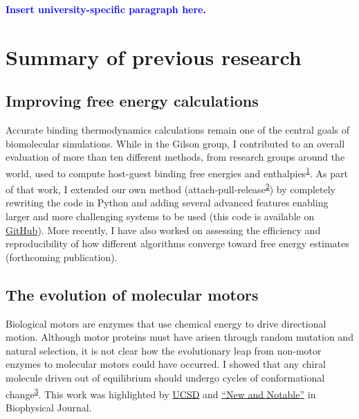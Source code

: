 \documentclass[11pt,notitlepage]{article}
\begin{document}
\textcolor{blue}{\textbf{Insert university-specific paragraph here.}}

\hypertarget{summary-of-previous-research}{%
\section{Summary of previous
research}\label{summary-of-previous-research}}

\hypertarget{improving-free-energy-calculations}{%
\subsection{Improving free energy
calculations}\label{improving-free-energy-calculations}}

Accurate binding thermodynamics calculations remain one of the central
goals of biomolecular simulations. While in the Gilson group, I
contributed to an overall evaluation of more than ten different methods,
from research groups around the world, used to compute host-guest
binding free energies and
enthalpies\textsuperscript{\protect\hyperlink{ref-BGsUYQln}{1}}. As part
of that work, I extended our own method
(attach-pull-release\textsuperscript{\protect\hyperlink{ref-uzHaEv9Z}{2}})
by completely rewriting the code in Python and adding several advanced
features enabling larger and more challenging systems to be used (this
code is available on
\href{https://www.github.com/slochower/pAPRika}{GitHub}). More recently,
I have also worked on assessing the efficiency and reproducibility of
how different algorithms converge toward free energy estimates
(forthcoming publication).

\hypertarget{the-evolution-of-molecular-motors}{%
\subsection{The evolution of molecular
motors}\label{the-evolution-of-molecular-motors}}

Biological motors are enzymes that use chemical energy to drive
directional motion. Although motor proteins must have arisen through
random mutation and natural selection, it is not clear how the
evolutionary leap from non-motor enzymes to molecular motors could have
occurred. I showed that any chiral molecule driven out of equilibrium
should undergo cycles of conformational
change\textsuperscript{\protect\hyperlink{ref-1BfYw0gk2}{3}}. This work
was highlighted by
\href{http://ucsdhealthsciences.tumblr.com/post/173707350285/its-not-intelligent-design-so-how-did}{UCSD}
and
\href{https://www.cell.com/biophysj/fulltext/S0006-3495(18)30444-2}{``New
and Notable''} in Biophysical Journal.
\end{document}
